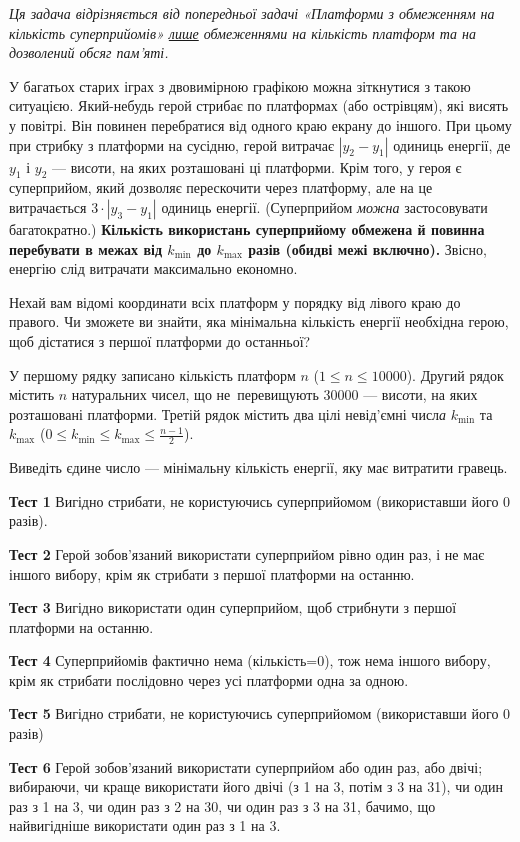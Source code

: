 ﻿{\it Ця задача відрізняється від попередньої задачі «Платформи з обмеженням на кількість суперприйомів» \underline{лише} обмеженнями на кількість платформ та на дозволений обсяг пам'яті.}

  У багатьох старих іграх з двовимірною графікою можна зіткнутися з такою ситуацією. Який-небудь герой стрибає по платформах (або острівцям), 
  які висять у повітрі. Він повинен перебратися від одного краю екрану до іншого. При цьому при стрибку з  платформи на сусідню, 
  герой витрачає $|y_2-y_1|$ одиниць енергії, де $y_1$ і $y_2$ ---
  вис{\it о}ти, на яких розташовані ці платформи. Крім того, у героя є суперприйом, який дозволяє перескочити через платформу, 
  але на це витрачається $3\cdot|y_3-y_1|$ одиниць енергії. (Суперприйом \emph{можна} застосовувати багатократно.) 
  {\bf
  Кількість використань суперприйому обмежена й повинна перебувати в межах від $k_{\min}$ до $k_{\max}$ разів (обидві межі включно).   
  }
  Звісно, енергію слід витрачати максимально економно.
       


	Нехай вам відомі координати всіх платформ у порядку від лівого краю до правого. 
	Чи зможете ви знайти, яка мінімальна кількість енергії необхідна герою, щоб дістатися з першої платформи до останньої?

\InputFile
  У першому рядку записано кількість платформ $n$ ($1\leqslant n\leqslant 10000$). Другий рядок містить $n$ натуральних чисел, 
  що не~перевищують 30000 --- вис{\it о}ти, на яких розташовані платформи.
  Третій рядок містить два цілі невід'ємні числ{\it а} $k_{\min}$ та $k_{\max}$ ($0\leqslant k_{\min}\leqslant k_{\max}\leqslant \frac{n-1}{2}$). 

\OutputFile
  Виведіть єдине число --- мінімальну кількість енергії, яку має витратити гравець.

\Examples
\begin{example}
\end{example}

\Note

{\bf Тест 1} Вигідно стрибати, не користуючись суперприйомом (використавши його 0 разів).

{\bf Тест 2} Герой зобов’язаний використати суперприйом рівно один раз, і не має іншого вибору, крім як стрибати з першої платформи на останню.

{\bf Тест 3} Вигідно використати один суперприйом, щоб стрибнути з першої платформи на останню.

{\bf Тест 4} Суперприйомів фактично нема (кількість=0), тож нема іншого вибору, крім як стрибати послідовно через усі платформи одна за одною.

{\bf Тест 5} Вигідно стрибати, не користуючись суперприйомом (використавши його 0 разів)

{\bf Тест 6} Герой зобов’язаний використати суперприйом або один раз, або двічі; вибираючи, чи краще використати його двічі (з 1 на 3, потім з 3 на 31), чи один раз з 1 на 3, чи один раз з 2 на 30, чи один раз з 3 на 31, бачимо, що найвигідніше використати один раз з 1 на 3.

